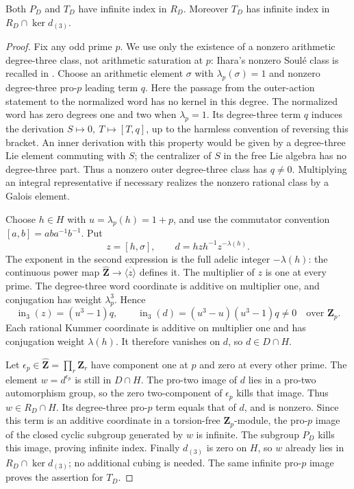 \begin{proposition}\label{prop:all-prime-residual-strictness}
Both \(P_D\) and \(T_D\) have infinite index in \(R_D\).
Moreover \(T_D\) has infinite index in \(R_D\cap\ker d_{(3)}\).
\end{proposition}
\begin{proof}
Fix any odd prime \(p\). We use only the existence of a
nonzero arithmetic degree-three class, not arithmetic
saturation at \(p\): Ihara's nonzero Soul\'e class is recalled
in \cite[Remark~8.6, p.~151]{HainMatsumoto2003}.
Choose an arithmetic element \(\sigma\) with \(\lambda_p(\sigma)=1\)
and nonzero degree-three pro-\(p\) leading term \(q\).
Here the passage from the outer-action statement to the
normalized word has no kernel in this degree. The normalized
word has zero degrees one and two when \(\lambda_p=1\).
Its degree-three term \(q\) induces the derivation
\(S\mapsto0,\ T\mapsto[T,q]\), up to the harmless convention
of reversing this bracket. An inner derivation with this
property would be given by a degree-three Lie element
commuting with \(S\); the centralizer of \(S\) in the free
Lie algebra has no degree-three part. Thus a nonzero outer
degree-three class has \(q\ne0\). Multiplying an integral
representative if necessary realizes the nonzero rational
class by a Galois element.

Choose \(h\in H\) with \(u=\lambda_p(h)=1+p\), and use the
commutator convention \([a,b]=aba^{-1}b^{-1}\). Put
\[
 z=[h,\sigma],\qquad
 d=hzh^{-1}z^{-\lambda(h)}.
\]
The exponent in the second expression is the full adelic
integer \(-\lambda(h)\): the continuous power map
\(\widehat{\mathbf Z}\to\overline{\langle z\rangle}\)
defines it. The multiplier of \(z\) is one at every prime.
The degree-three word coordinate is additive on multiplier
one, and conjugation has weight \(\lambda_p^3\). Hence
\[
 \operatorname{in}_3(z)=(u^3-1)q,\qquad
 \operatorname{in}_3(d)=(u^3-u)(u^3-1)q\ne0
                  \quad\text{over }\mathbf Z_p.
\]
Each rational Kummer coordinate is additive on multiplier
one and has conjugation weight \(\lambda(h)\).
It therefore vanishes on \(d\), so \(d\in D\cap H\).

Let \(\epsilon_p\in\widehat{\mathbf Z}=\prod_r\mathbf Z_r\)
have component one at \(p\) and zero at every other prime.
The element \(w=d^{\epsilon_p}\) is still in \(D\cap H\).
The pro-two image of \(d\) lies in a pro-two automorphism
group, so the zero two-component of \(\epsilon_p\) kills
that image. Thus \(w\in R_D\cap H\).
Its degree-three pro-\(p\) term equals that of \(d\), and is
nonzero. Since this term is an additive coordinate in a
torsion-free \(\mathbf Z_p\)-module, the pro-\(p\) image
of the closed cyclic subgroup generated by \(w\) is infinite.
The subgroup \(P_D\) kills this image, proving infinite index.
Finally \(d_{(3)}\) is zero on \(H\), so \(w\) already lies in
\(R_D\cap\ker d_{(3)}\); no additional cubing is needed.
The same infinite pro-\(p\) image proves the assertion for
\(T_D\).
\end{proof}

